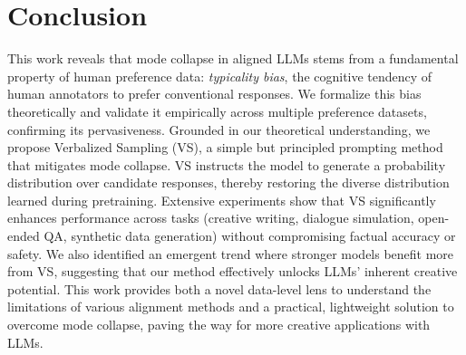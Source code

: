 \section{Conclusion}\label{sec:conclusion}



This work reveals that mode collapse in aligned LLMs stems from a fundamental property of human preference data: \textit{typicality bias}, the cognitive tendency of human annotators to prefer conventional responses. We formalize this bias theoretically and validate it empirically across multiple preference datasets, confirming its pervasiveness. Grounded in our theoretical understanding, we propose Verbalized Sampling (VS), a simple but principled prompting method that mitigates mode collapse. VS instructs the model to generate a probability distribution over candidate responses, thereby restoring the diverse distribution learned during pretraining. 
Extensive experiments show that VS significantly enhances performance across tasks (creative writing, dialogue simulation, open-ended QA, synthetic data generation) without compromising factual accuracy or safety. We also identified an emergent trend where stronger models benefit more from VS, suggesting that our method effectively unlocks LLMs' inherent creative potential. %
This work provides both a novel data-level lens to understand the limitations of various alignment methods and a practical, lightweight solution to overcome mode collapse, paving the way for more creative applications with LLMs.





